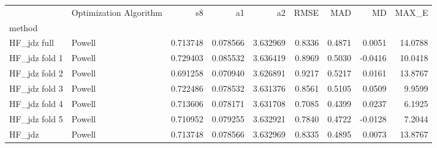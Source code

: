 \begin{tabular}{llrrrrrrr}
 & Optimization Algorithm & s8 & a1 & a2 & RMSE & MAD & MD & MAX_E \\
method &  &  &  &  &  &  &  &  \\
HF_jdz full & Powell & 0.713748 & 0.078566 & 3.632969 & 0.8336 & 0.4871 & 0.0051 & 14.0788 \\
HF_jdz fold 1 & Powell & 0.729403 & 0.085532 & 3.636419 & 0.8969 & 0.5030 & -0.0416 & 10.0418 \\
HF_jdz fold 2 & Powell & 0.691258 & 0.070940 & 3.626891 & 0.9217 & 0.5217 & 0.0161 & 13.8767 \\
HF_jdz fold 3 & Powell & 0.722486 & 0.078532 & 3.631376 & 0.8561 & 0.5105 & 0.0509 & 9.9599 \\
HF_jdz fold 4 & Powell & 0.713606 & 0.078171 & 3.631708 & 0.7085 & 0.4399 & 0.0237 & 6.1925 \\
HF_jdz fold 5 & Powell & 0.710952 & 0.079255 & 3.632921 & 0.7840 & 0.4722 & -0.0128 & 7.2044 \\
HF_jdz & Powell & 0.713748 & 0.078566 & 3.632969 & 0.8335 & 0.4895 & 0.0073 & 13.8767 \\
\end{tabular}
